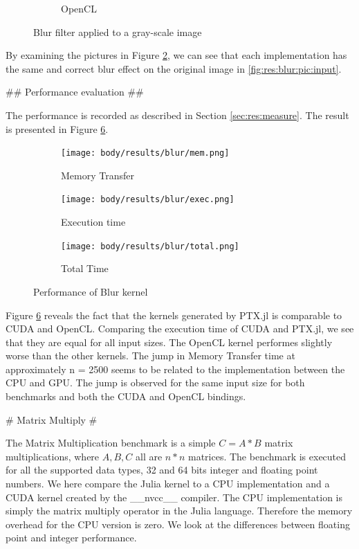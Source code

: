 \begin{markdown}
\begin{figure}[H]
\begin{subfigure}{.49\textwidth}
    \caption{OpenCL}
    \label{fig:res:blur:pic:opencl}
  \end{subfigure}
  \caption{Blur filter applied to a gray-scale image}
  \label{fig:res:blur:pic}
\end{figure}

By examining the pictures in Figure \ref{fig:res:blur:pic}, we can see
that each implementation has the same and correct blur effect on the
original image in \ref{fig:res:blur:pic:input}.

## Performance evaluation ##
\label{sec:res:blur:perf}

The performance is recorded as described in Section
\ref{sec:res:measure}. The result is presented in Figure \ref{fig:res:blur}.

\begin{figure}[H]
  \centering
  \begin{subfigure}{.33\textwidth}
    \centering
    \texttt{[image: body/results/blur/mem.png]}
    \caption{Memory Transfer}
    \label{fig:res:blur:int32:mem}
  \end{subfigure}%
  \begin{subfigure}{.33\textwidth}
    \centering
    \texttt{[image: body/results/blur/exec.png]}
    \caption{Execution time}
    \label{fig:res:blur:int32:exec}
  \end{subfigure}%
  \begin{subfigure}{.33\textwidth}
    \centering
    \texttt{[image: body/results/blur/total.png]}
    \caption{Total Time}
    \label{fig:res:blur:int32:tot}
  \end{subfigure}%
  \caption{Performance of Blur kernel}
  \label{fig:res:blur}
\end{figure}

Figure \ref{fig:res:blur} reveals the fact that the kernels generated
by PTX.jl is comparable to CUDA and OpenCL. Comparing the execution
time of CUDA and PTX.jl, we see that they are equal for all input
sizes. The OpenCL kernel performes slightly worse than the other
kernels. The jump in Memory Transfer time at approximately n = 2500
seems to be related to the implementation between the CPU and GPU. The
jump is observed for the same input size for both benchmarks and both
the CUDA and OpenCL bindings.

# Matrix Multiply #
\label{sec:res:mm}

The Matrix Multiplication benchmark is a simple $C = A * B$ matrix
multiplications, where $A, B, C$ all are $n*n$ matrices. The benchmark
is executed for all the supported data types, 32 and 64 bits integer
and floating point numbers. We here compare the Julia kernel to a CPU
implementation and a CUDA kernel created by the __nvcc__ compiler.
The CPU implementation is simply the matrix multiply operator in the
Julia language. Therefore the memory overhead for the CPU version is
zero. We look at the differences between floating point and integer
performance.


\end{markdown}
